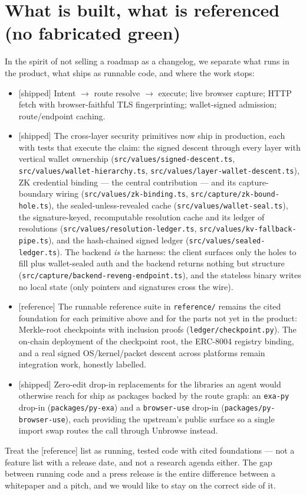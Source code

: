 \documentclass[11pt]{article}
\newcommand{\impl}{\textcolor{green!55!black}{\small[shipped]}}
\newcommand{\refimpl}{\textcolor{blue!70!black}{\small[reference]}}
\begin{document}
\section{What is built, what is referenced (no fabricated green)}

In the spirit of not selling a roadmap as a changelog, we separate what runs in the
product, what ships as runnable code, and where the work stops:
\begin{itemize}[leftmargin=1.4em]
\item \impl{} Intent $\to$ route resolve $\to$ execute; live browser capture; HTTP
fetch with browser-faithful TLS fingerprinting; wallet-signed admission;
route/endpoint caching.
\item \impl{} The cross-layer security primitives now ship in production, each with
tests that execute the claim: the signed descent through every layer with vertical
wallet ownership (\texttt{src/values/signed-descent.ts}, \texttt{src/values/wallet-hierarchy.ts},
\texttt{src/values/layer-wallet-descent.ts}), ZK credential binding --- the central
contribution --- and its capture-boundary wiring (\texttt{src/values/zk-binding.ts},
\texttt{src/capture/zk-bound-hole.ts}), the sealed-unless-revealed cache
(\texttt{src/values/wallet-seal.ts}), the signature-keyed, recomputable resolution
cache and its ledger of resolutions (\texttt{src/values/resolution-ledger.ts},
\texttt{src/values/kv-fallback-pipe.ts}), and the hash-chained signed ledger
(\texttt{src/values/sealed-ledger.ts}). The backend \emph{is} the harness: the client
surfaces only the holes to fill plus wallet-sealed auth and the backend returns nothing
but structure (\texttt{src/capture/backend-reveng-endpoint.ts}), and the stateless
binary writes no local state (only pointers and signatures cross the wire).
\item \refimpl{} The runnable reference suite in \texttt{reference/} remains the
cited foundation for each primitive above and for the parts not yet in the product:
Merkle-root checkpoints with inclusion proofs (\texttt{ledger/checkpoint.py}). The
on-chain deployment of the checkpoint root, the ERC-8004 registry binding, and a
real signed OS/kernel/packet descent across platforms remain integration work,
honestly labelled.
\item \impl{} Zero-edit drop-in replacements for the libraries an agent would
otherwise reach for ship as packages backed by the route graph: an \texttt{exa-py}
drop-in (\texttt{packages/py-exa}) and a \texttt{browser-use} drop-in
(\texttt{packages/py-browser-use}), each providing the upstream's public surface so a
single import swap routes the call through Unbrowse instead.
\end{itemize}
Treat the \refimpl{} list as running, tested code with cited foundations --- not a
feature list with a release date, and not a research agenda either. The gap between
running code and a press release is the entire difference between a whitepaper and a
pitch, and we would like to stay on the correct side of it.
\end{document}
